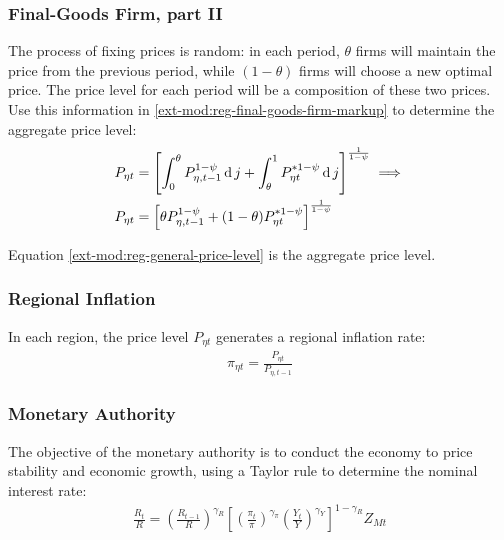 \documentclass[../thesis.tex]{subfiles}
\begin{document}

\subsubsection*{Final-Goods Firm, part II}

The process of fixing prices is random: in each period, $\theta$ firms will maintain the price from the previous period, while $(1-\theta)$ firms will choose a new optimal price. The price level for each period will be a composition of these two prices. Use this information in \ref{ext-mod:reg-final-goods-firm-markup} to determine the aggregate price level:
\begin{align}
	P_{\eta t} & = \left[ \int_{0}^{\theta} P_{\eta, t-1}^{1-\psi} \operatorname{d} j + \int_{\theta}^{1} P_{\eta t}^{\ast 1-\psi} \operatorname{d} j \right]^{\frac{1}{1-\psi}}  \implies \nonumber \\
	P_{\eta t} & = \left[ \theta P_{\eta, t-1}^{1-\psi} + (1-\theta) P_{\eta t}^{\ast 1-\psi} \right]^\frac{1}{1-\psi} \label{ext-mod:reg-general-price-level}
\end{align}

Equation \ref{ext-mod:reg-general-price-level} is the aggregate price level.


\subsubsection*{Regional Inflation}

In each region, the price level $P_{\eta t}$ generates a regional inflation rate:
\begin{align}
	\pi_{\eta t} = \frac{P_{\eta t}}{P_{\eta, t-1}} \label{ext-mod:reg-regional-inflation}
\end{align}


\subsubsection{Monetary Authority}

The objective of the monetary authority is to conduct the economy to price stability and economic growth, using a Taylor rule \cite{taylor_discretion_1993} to determine the nominal interest rate:
\begin{align}
	\label{ext-mod:reg-monetary-policy}
	\frac{R_{t}}{R} =
	\left( \frac{R_{t-1}}{R} \right)^{\gamma_{R}}  \left[
	\left( \frac{\pi_t}{\pi} \right)^{\gamma_{\pi}}
	\left( \frac{Y_{t}}{Y} \right)^{\gamma_{Y}} \right]^{1-\gamma_{R}} Z_{Mt}
\end{align}
\end{document}
